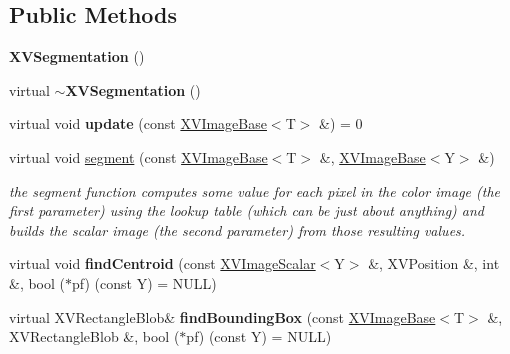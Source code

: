 \subsection*{Public Methods}
\begin{CompactItemize}
\item 
{\bf XVSegmentation} ()
\item 
\label{XVSegmentation_a1}
\hypertarget{class_XVSegmentation_a1}{
virtual {\bf $\sim$XVSegmentation} ()}

\item 
\label{XVSegmentation_a2}
\hypertarget{class_XVSegmentation_a2}{
virtual void {\bf update} (const \hyperlink{class_XVImageBase}{XVImage\-Base}$<$T$>$ \&) = 0}

\item 
\label{XVSegmentation_a3}
\hypertarget{class_XVSegmentation_a3}{
virtual void \hyperlink{class_XVSegmentation_a3}{segment} (const \hyperlink{class_XVImageBase}{XVImage\-Base}$<$T$>$ \&, \hyperlink{class_XVImageBase}{XVImage\-Base}$<$Y$>$ \&)}

\begin{CompactList}\small\item\em the segment function computes some value for each pixel in the color image (the first parameter) using the lookup table (which can be just about anything) and builds the scalar image (the second parameter) from those resulting values.\item\end{CompactList}\item 
\label{XVSegmentation_a4}
\hypertarget{class_XVSegmentation_a4}{
virtual void {\bf find\-Centroid} (const \hyperlink{class_XVImageScalar}{XVImage\-Scalar}$<$Y$>$ \&, XVPosition \&, int \&, bool ($\ast$pf) (const Y) = NULL)}

\item 
\label{XVSegmentation_a5}
\hypertarget{class_XVSegmentation_a5}{
virtual XVRectangle\-Blob\& {\bf find\-Bounding\-Box} (const \hyperlink{class_XVImageBase}{XVImage\-Base}$<$T$>$ \&, XVRectangle\-Blob \&, bool ($\ast$pf) (const Y) = NULL)}


\end{CompactItemize}
